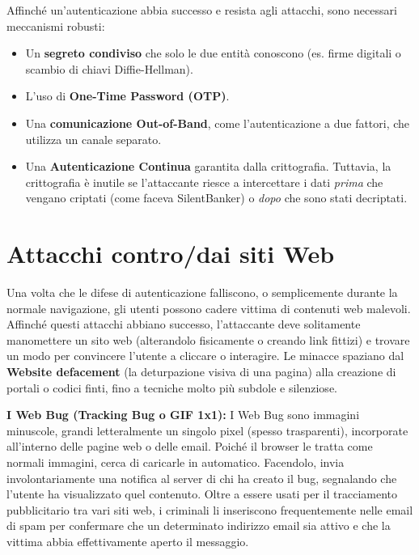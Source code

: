 \documentclass{article}
\begin{document}
Affinché un'autenticazione abbia successo e resista agli attacchi, sono necessari meccanismi robusti:

\begin{itemize}
    \item Un \textbf{segreto condiviso} che solo le due entità conoscono (es. firme digitali o scambio di chiavi Diffie-Hellman).
    \item L'uso di \textbf{One-Time Password (OTP)}.
    \item Una \textbf{comunicazione Out-of-Band}, come l'autenticazione a due fattori, che utilizza un canale separato.
    \item Una \textbf{Autenticazione Continua} garantita dalla crittografia. Tuttavia, la crittografia è inutile se l'attaccante riesce a intercettare i dati \textit{prima} che vengano criptati (come faceva SilentBanker) o \textit{dopo} che sono stati decriptati.
\end{itemize}

\vspace{0.8cm}

\section*{Attacchi contro/dai siti Web}

Una volta che le difese di autenticazione falliscono, o semplicemente durante la normale navigazione, gli utenti possono cadere vittima di contenuti web malevoli. Affinché questi attacchi abbiano successo, l'attaccante deve solitamente manomettere un sito web (alterandolo fisicamente o creando link fittizi) e trovare un modo per convincere l'utente a cliccare o interagire. Le minacce spaziano dal \textbf{Website defacement} (la deturpazione visiva di una pagina) alla creazione di portali o codici finti, fino a tecniche molto più subdole e silenziose.

\vspace{0.3cm}
\noindent \textbf{I Web Bug (Tracking Bug o GIF 1x1):} I Web Bug sono immagini minuscole, grandi letteralmente un singolo pixel (spesso trasparenti), incorporate all'interno delle pagine web o delle email. Poiché il browser le tratta come normali immagini, cerca di caricarle in automatico. Facendolo, invia involontariamente una notifica al server di chi ha creato il bug, segnalando che l'utente ha visualizzato quel contenuto. Oltre a essere usati per il tracciamento pubblicitario tra vari siti web, i criminali li inseriscono frequentemente nelle email di spam per confermare che un determinato indirizzo email sia attivo e che la vittima abbia effettivamente aperto il messaggio.
\end{document}
